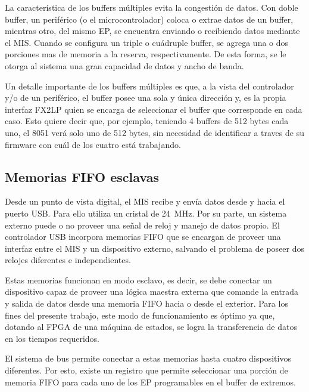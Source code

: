 	La característica de los buffers múltiples evita la congestión de datos. Con doble buffer, un periférico (o el microcontrolador) coloca o extrae datos de un buffer, mientras otro, del mismo EP, se encuentra enviando o recibiendo datos mediante el MIS. Cuando se configura un triple o cuádruple buffer, se agrega una o dos porciones mas de memoria a la reserva, respectivamente. De esta forma, se le otorga al sistema una gran capacidad de datos y ancho de banda.%
	
	Un detalle importante de los buffers múltiples es que, a la vista del controlador y/o de un periférico, el buffer posee una sola y única dirección y, es la propia interfaz FX2LP quien se encarga de seleccionar el buffer que corresponde en cada caso. Esto quiere decir que, por ejemplo, teniendo 4 buffers de 512 bytes cada uno, el 8051 verá solo uno de 512 bytes, sin necesidad de identificar a traves de su firmware con cuál de los cuatro está trabajando.
	
\subsection{Memorias FIFO esclavas}		

	Desde un punto de vista digital, el MIS recibe y envía datos desde y hacia el puerto USB. Para ello utiliza un cristal de \SI{24}{\mega\hertz}. Por su parte, un sistema externo puede o no proveer una señal de reloj y manejo de datos propio. El controlador USB incorpora memorias FIFO que se encargan de proveer una interfaz entre el MIS y un dispositivo externo, salvando el problema de poseer dos relojes diferentes e independientes.%
	
	Estas memorias funcionan en modo esclavo, es decir, se debe conectar un dispositivo capaz de proveer una lógica maestra externa que comande la entrada y salida de datos desde una memoria FIFO hacia o desde el exterior. Para los fines del presente trabajo, este modo de funcionamiento es óptimo ya que, dotando al FPGA de una máquina de estados, se logra la transferencia de datos en los tiempos requeridos.%
	
	El sistema de bus permite conectar a estas memorias hasta cuatro dispositivos diferentes. Por esto, existe un registro que permite seleccionar una porción de memoria FIFO para cada uno de los EP programables en el buffer de extremos.%
	
